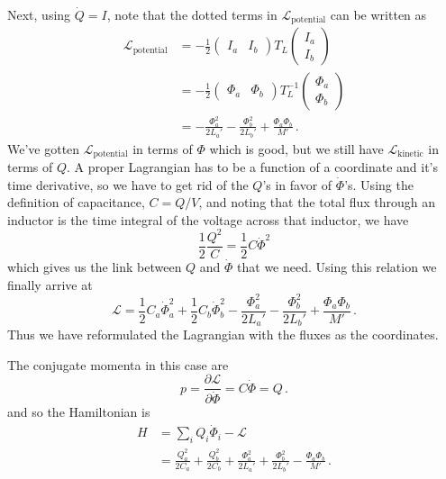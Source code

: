 Next, using $\dot{Q}=I$, note that the dotted terms in $\mathcal{L}_\text{potential}$ can be written as
\begin{align*}
  \mathcal{L}_\text{potential}
  &= -\frac{1}{2}
    \begin{pmatrix} I_a & I_b \end{pmatrix} T_L \begin{pmatrix} I_a \\ I_b \end{pmatrix} \\
  &= -\frac{1}{2}
    \begin{pmatrix} \Phi_a & \Phi_b \end{pmatrix}
    T_L^{-1}
    \begin{pmatrix} \Phi_a \\ \Phi_b \end{pmatrix} \\
  &= - \frac{\Phi_a^2}{2 L_a'} - \frac{\Phi_b^2}{2 L_b'} + \frac{\Phi_a \Phi_b}{M'}
  \, .
\end{align*}
We've gotten $\mathcal{L}_\text{potential}$ in terms of $\Phi$ which is good, but we still have $\mathcal{L}_\text{kinetic}$ in terms of $Q$.
A proper Lagrangian has to be a function of a coordinate and it's time derivative, so we have to get rid of the $Q$'s in favor of $\dot \Phi$'s.
Using the definition of capacitance, $C = Q/V$, and noting that the total flux through an inductor is the time integral of the voltage across that inductor, we have
\begin{equation*}
  \frac{1}{2}\frac{Q^2}{C} = \frac{1}{2}C \dot{\Phi}^2
\end{equation*}
which gives us the link between $Q$ and $\dot \Phi$ that we need.
Using this relation we finally arrive at
\begin{equation*}
  \mathcal{L} =
  \frac{1}{2}C_a \dot{\Phi}_a^2 + \frac{1}{2}C_b \dot{\Phi}_b^2
  - \frac{\Phi_a^2}{2L_a'} - \frac{\Phi_b^2}{2L_b'}
  + \frac{\Phi_a \Phi_b}{M'}
  \, .
\end{equation*}
Thus we have reformulated the Lagrangian with the fluxes as the coordinates.

The conjugate momenta in this case are
\begin{equation}
  p = \frac{\partial \mathcal{L}}{\partial \dot{\Phi}} = C \dot{\Phi} = Q \, .
\end{equation}
and so the Hamiltonian is
\begin{align}
  H
  &= \sum_i Q_i \dot{\Phi}_i - \mathcal{L} \nonumber \\
  &=
    \frac{Q_a^2}{2 C_a} + \frac{Q_b^2}{2 C_b}
    + \frac{\Phi_a^2}{2L_a'} + \frac{\Phi_b^2}{2L_b'}
    - \frac{\Phi_a \Phi_b}{M'}
  \, .
\end{align}
